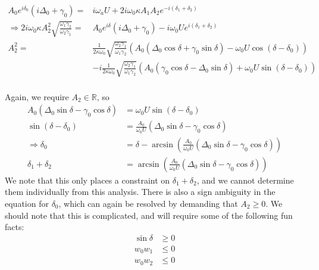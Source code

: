 \begin{subequations}
\begin{align}
A_0 e^{i\delta_0}(i\Delta_0 + \gamma_0) = & i\omega_a U + 2i\omega_0 \kappa A_1 A_2 e^{-i(\delta_1 + \delta_2)} \\
\Rightarrow 2i\omega_0\kappa A_2^2\sqrt{\frac{\omega_1\gamma_2}{\omega_2\gamma_1}} = & A_0 e^{i\delta}(i\Delta_0 + \gamma_0) - i\omega_0 U e^{i(\delta_1 + \delta_2)} \\
A_2^2 = & \frac{1}{2\kappa\omega_0} \sqrt{\frac{\omega_2\gamma_1}{\omega_1\gamma_2}} \left(A_0 (\Delta_0 \cos{\delta} + \gamma_0 \sin{\delta}) -\omega_0 U \cos(\delta-\delta_0)\right) \\
      & -i \frac{1}{2\kappa\omega_0} \sqrt{\frac{\omega_2\gamma_1}{\omega_1\gamma_2}}\left(A_0(\gamma_0\cos\delta - \Delta_0\sin\delta) + \omega_0 U \sin(\delta-\delta_0)\right) \\
\end{align}
\end{subequations}

Again, we require $A_2 \in \mathbb{R}$, so
\begin{subequations}
\begin{align}
A_0(\Delta_0\sin\delta - \gamma_0\cos\delta) & = \omega_0 U \sin(\delta-\delta_0) \\
\sin(\delta-\delta_0) & = \frac{A_0}{\omega_0 U} \left( \Delta_0 \sin\delta - \gamma_0\cos\delta \right) \\
\Rightarrow \delta_0 & = \delta - \arcsin\left(\frac{A_0}{\omega_0 U} \left( \Delta_0 \sin\delta - \gamma_0\cos\delta \right)\right) \\
\delta_1 + \delta_2 & = \arcsin\left(\frac{A_0}{\omega_0 U} \left( \Delta_0 \sin\delta - \gamma_0\cos\delta \right)\right) 
\end{align}
\end{subequations}
We note that this only places a constraint on $\delta_1 + \delta_2$, and we cannot determine them individually from this analysis. There is also a sign ambiguity in the equation for $\delta_0$, which can again be resolved by demanding that $A_2 \geq 0$. We should note that this is complicated, and will require some of the following fun facts:
\begin{subequations}
\begin{align}
\sin\delta &\geq 0 \\
w_0 w_1 & \leq 0 \\
w_0 w_2 & \leq 0 
\end{align}
\end{subequations}


